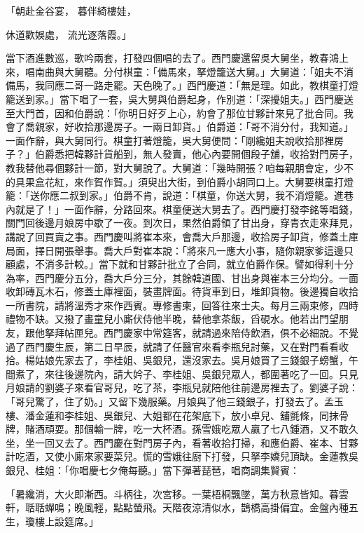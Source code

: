 「朝赴金谷宴，  暮伴綺樓娃，

休道歡娛處，  流光逐落霞。」

當下酒進數巡，歌吟兩套，打發四個唱的去了。西門慶還留吳大舅坐，教春鴻上來，唱南曲與大舅聽。分付棋童：「備馬來，拏燈籠送大舅。」大舅道：「姐夫不消備馬，我同應二哥一路走罷。天色晚了。」西門慶道：「無是理。如此，教棋童打燈籠送到家。」當下唱了一套，吳大舅與伯爵起身，作別道：「深擾姐夫。」西門慶送至大門首，因和伯爵說：「你明日好歹上心，約會了那位甘夥計來見了批合同。我會了喬親家，好收拾那邊房子。一兩日卸貨。」伯爵道：「哥不消分付，我知道。」一面作辭，與大舅同行。棋童打著燈籠，吳大舅便問：「剛纔姐夫說收拾那裡房子？」伯爵悉把韓夥計貨船到，無人發賣，他心內要開個段子舖，收拾對門房子，教我替他尋個夥計一節，對大舅說了。大舅道：「幾時開張？咱每親朋會定，少不的具果盒花紅，來作賀作賀。」須臾出大街，到伯爵小胡同口上。大舅要棋童打燈籠：「送你應二叔到家。」伯爵不肯，說道：「棋童，你送大舅，我不消燈籠。進巷內就是了！」一面作辭，分路回來。棋童便送大舅去了。西門慶打發李銘等唱錢，關門回後邊月娘房中歇了一夜。到次日，果然伯爵領了甘出身，穿青衣走來拜見，講說了回買賣之事。西門慶叫將崔本來，會喬大戶那邊，收拾房子卸貨，修蓋土庫局面，擇日開張舉事。喬大戶對崔本說：「將來凡一應大小事，隨你親家爹這邊只顧處，不消多計較。」當下就和甘夥計批立了合同，就立伯爵作保。譬如得利十分為率，西門慶分五分，喬大戶分三分，其餘韓道國、甘出身與崔本三分均分。一面收卸磚瓦木石，修蓋土庫裡面，裝畫牌面。待貨車到日，堆卸貨物。後邊獨自收拾一所書院，請將溫秀才來作西賓。專修書柬，回答往來士夫。每月三兩束修，四時禮物不缺。又撥了畫童兒小廝伏侍他半晚，替他拿茶飯，舀硯水。他若出門望朋友，跟他拏拜帖匣兒。西門慶家中常筵客，就請過來陪侍飲酒，俱不必細說。不覺過了西門慶生辰，第二日早辰，就請了任醫官來看李瓶兒討藥，又在對門看看收拾。楊姑娘先家去了，李桂姐、吳銀兒，還沒家去。吳月娘買了三錢銀子螃蟹，午間煮了，來往後邊院內，請大妗子、李桂姐、吳銀兒眾人，都圍著吃了一回。只見月娘請的劉婆子來看官哥兒，吃了茶，李瓶兒就陪他往前邊房裡去了。劉婆子說：「哥兒驚了，住了奶。」又留下幾服藥。月娘與了他三錢銀子，打發去了。孟玉樓、潘金蓮和李桂姐、吳銀兒、大姐都在花架底下，放小卓兒、舖氈條，同抹骨牌，賭酒頑耍。那個輸一牌，吃一大杯酒。孫雪娥吃眾人贏了七八鍾酒，又不敢久坐，坐一回又去了。西門慶在對門房子內，看著收拾打掃，和應伯爵、崔本、甘夥計吃酒，又使小廝來家要菜兒。慌的雪娥往廚下打發，只拏李嬌兒頂缺。金蓮教吳銀兒、桂姐：「你唱慶七夕俺每聽。」當下彈著琵琶，唱商調集賢賓：

「暑纔消，大火即漸西。斗柄往，次宮移。一葉梧桐飄墜，萬方秋意皆知。暮雲軒，聒聒蟬鳴；晚風輕，點點螢飛。天階夜涼清似水，鵲橋高掛偏宜。金盤內種五生，瓊樓上設筵席。」

